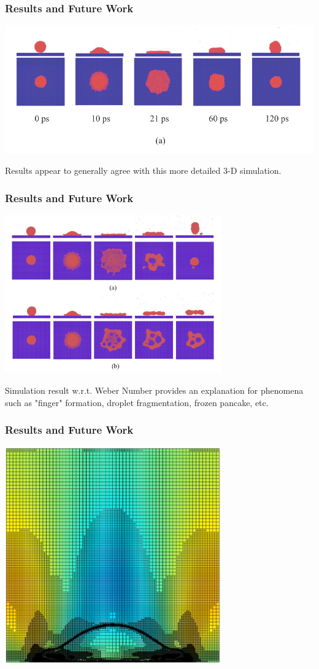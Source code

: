 \documentclass[12pt]{beamer}
\begin{document}
\begin{frame}
    \frametitle{Results and Future Work}
    \includegraphics[width=\textwidth]{img/wang-sim.png}

    Results appear to generally agree with this more detailed 3-D simulation.
\end{frame}
\begin{frame}
    \frametitle{Results and Future Work}
    \includegraphics[width=0.7\textwidth]{img/wang-high-weber.png}

    Simulation result w.r.t. Weber Number provides an explanation for phenomena 
    such as "finger" formation, droplet fragmentation, frozen pancake, etc.
\end{frame}
\begin{frame}
    \frametitle{Results and Future Work}
    \includegraphics[width=0.7\textwidth]{img/7-current.png}
\end{frame}
\end{document}
